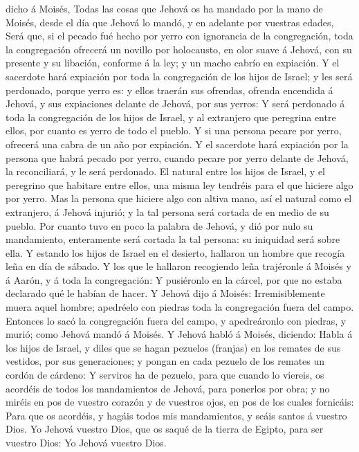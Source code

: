 dicho á Moisés,  Todas las cosas que Jehová os ha mandado
por la mano de Moisés, desde el día que Jehová lo mandó, y en adelante
por vuestras edades,  Será que, si el pecado fué hecho por
yerro con ignorancia de la congregación, toda la congregación ofrecerá
un novillo por holocausto, en olor suave á Jehová, con su presente y su
libación, conforme á la ley; y un macho cabrío en expiación.
 Y el sacerdote hará expiación por toda la congregación de
los hijos de Israel; y les será perdonado, porque yerro es: y ellos
traerán sus ofrendas, ofrenda encendida á Jehová, y sus expiaciones
delante de Jehová, por sus yerros:  Y será perdonado á toda
la congregación de los hijos de Israel, y al extranjero que peregrina
entre ellos, por cuanto es yerro de todo el pueblo.  Y si
una persona pecare por yerro, ofrecerá una cabra de un año por
expiación.  Y el sacerdote hará expiación por la persona
que habrá pecado por yerro, cuando pecare por yerro delante de Jehová,
la reconciliará, y le será perdonado.  El natural entre los
hijos de Israel, y el peregrino que habitare entre ellos, una misma ley
tendréis para el que hiciere algo por yerro.  Mas la
persona que hiciere algo con altiva mano, así el natural como el
extranjero, á Jehová injurió; y la tal persona será cortada de en medio
de su pueblo.  Por cuanto tuvo en poco la palabra de
Jehová, y dió por nulo su mandamiento, enteramente será cortada la tal
persona: su iniquidad será sobre ella.  Y estando los hijos
de Israel en el desierto, hallaron un hombre que recogía leña en día de
sábado.  Y los que le hallaron recogiendo leña trajéronle á
Moisés y á Aarón, y á toda la congregación:  Y pusiéronlo
en la cárcel, por que no estaba declarado qué le habían de hacer.
 Y Jehová dijo á Moisés: Irremisiblemente muera aquel
hombre; apedréelo con piedras toda la congregación fuera del campo.
 Entonces lo sacó la congregación fuera del campo, y
apedreáronlo con piedras, y murió; como Jehová mandó á Moisés.
 Y Jehová habló á Moisés, diciendo:  Habla á
los hijos de Israel, y diles que se hagan pezuelos (franjas) en los
remates de sus vestidos, por sus generaciones; y pongan en cada pezuelo
de los remates un cordón de cárdeno:  Y serviros ha de
pezuelo, para que cuando lo viereis, os acordéis de todos los
mandamientos de Jehová, para ponerlos por obra; y no miréis en pos de
vuestro corazón y de vuestros ojos, en pos de los cuales fornicáis:
 Para que os acordéis, y hagáis todos mis mandamientos, y
seáis santos á vuestro Dios.  Yo Jehová vuestro Dios, que
os saqué de la tierra de Egipto, para ser vuestro Dios: Yo Jehová
vuestro Dios.

